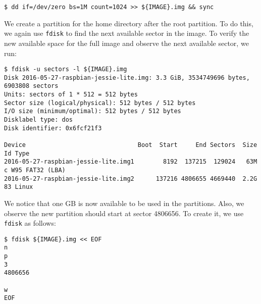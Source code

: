 \begin{lstlisting}[]
$ dd if=/dev/zero bs=1M count=1024 >> ${IMAGE}.img && sync
\end{lstlisting}
\FloatBarrier
\vspace{-5mm}

We create a partition for the home directory after the root partition.
To do this, we again use \texttt{fdisk} to find the next available sector
in the image. To verify the new available space for the full image and observe
the next available sector, we run:
\begin{lstlisting}[]
$ fdisk -u sectors -l ${IMAGE}.img
Disk 2016-05-27-raspbian-jessie-lite.img: 3.3 GiB, 3534749696 bytes, 6903808 sectors
Units: sectors of 1 * 512 = 512 bytes
Sector size (logical/physical): 512 bytes / 512 bytes
I/O size (minimum/optimal): 512 bytes / 512 bytes
Disklabel type: dos
Disk identifier: 0x6fcf21f3

Device                               Boot  Start     End Sectors  Size Id Type
2016-05-27-raspbian-jessie-lite.img1        8192  137215  129024   63M  c W95 FAT32 (LBA)
2016-05-27-raspbian-jessie-lite.img2      137216 4806655 4669440  2.2G 83 Linux
\end{lstlisting}
\FloatBarrier
\vspace{-5mm}

We notice that one GB is now available to be used in the partitions. Also, we
observe the new partition should start at sector 4806656. To create it, we
use \texttt{fdisk} as follows:%

%
%
%
\begin{lstlisting}[]
$ fdisk ${IMAGE}.img << EOF
n
p
3
4806656

w
EOF
\end{lstlisting}
\FloatBarrier
\vspace{-5mm}


